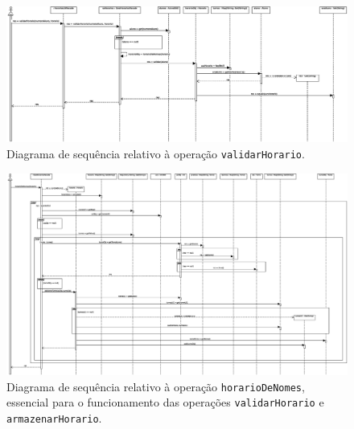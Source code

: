 \documentclass[12pt, a4paper]{article}
\begin{document}
\begin{landscape}
        \begin{figure}[H]
            \centering
            \includegraphics[scale=0.55]{Imagens/Modelos/validarHorarioDAO.svg.eps}
            \caption{
                Diagrama de sequência relativo à operação \texttt{validarHorario}.
            }
        \end{figure}

        \vspace*{\fill}
        \pagebreak
        \vspace*{\fill}

        \begin{figure}[H]
            \centering
            \includegraphics[scale=0.45]{Imagens/Modelos/horarioDeNomesDAO.svg.eps}
            \caption{
                Diagrama de sequência relativo à operação \texttt{horarioDeNomes}, essencial para o
                funcionamento das operações \texttt{validarHorario} e \texttt{armazenarHorario}.
            }
        \end{figure}

        \vspace*{\fill}
        \pagebreak
        \vspace*{\fill}


\end{landscape}
\end{document}
